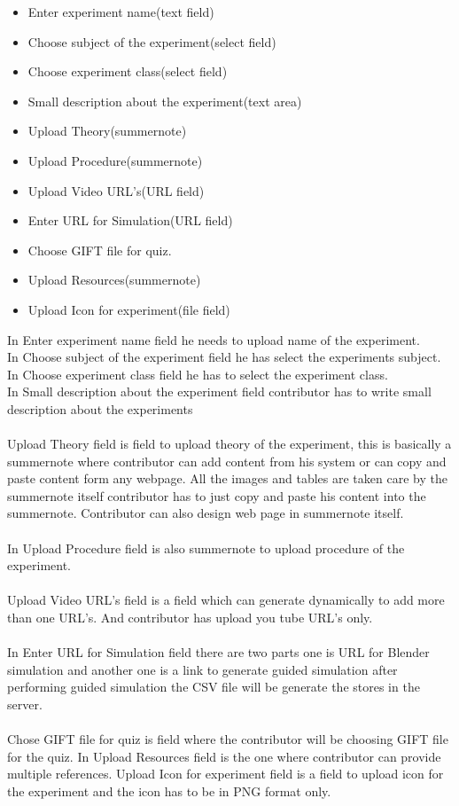 \documentclass[12pt]{report}
\begin{document}
\begin{itemize}

\item Enter experiment name(text field)
\item Choose subject of the experiment(select field)
\item Choose experiment class(select field)
\item Small description about the experiment(text area)
\item Upload Theory(summernote)
\item Upload Procedure(summernote)
\item Upload Video URL's(URL field)
\item Enter URL for Simulation(URL field)
\item Choose GIFT file for quiz.
\item Upload Resources(summernote)
\item Upload Icon for experiment(file field)

\end{itemize}

In Enter experiment name field he needs to upload name of the experiment.\\
In Choose subject of the experiment field he has select the experiments subject.\\
In Choose experiment class field he has to select the experiment class.\\
In Small description about the experiment field contributor has to write small description about the experiments\\ \\
Upload Theory field is field to upload theory of the experiment, this is basically a summernote where contributor can add content from his system or can copy and paste content form any webpage. All the images and tables are taken care by the summernote itself contributor has to just copy and paste his content into the summernote. Contributor can also design web page in summernote itself.\\ \\
In Upload Procedure field is also summernote to upload procedure of the experiment.\\ \\
Upload Video URL's field is a field which can generate dynamically to add more than one URL’s.  And contributor has upload you tube URL’s only.\\ \\
In Enter URL for Simulation field there are two parts one is URL for Blender simulation and another one is a link to generate guided simulation after performing guided simulation the CSV file will be generate the stores in the server.\\ \\
Chose GIFT file for quiz is field where the contributor will be choosing GIFT file for the quiz.
In Upload Resources field is the one where contributor can provide multiple references.
Upload Icon for experiment field is a field to upload icon for the experiment and the icon has to be in PNG format only.\\ \\
\end{document}
